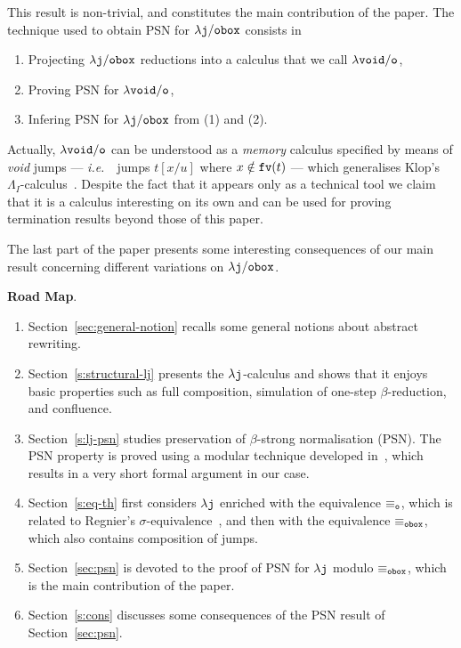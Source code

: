 \documentclass{LMCS}
\newcommand{\ie}{{\it  i.e.}~}
\renewcommand{\>}{\rightarrow}
\def\lam{\lambda}
\newcommand{\dis}{{\tt j}}
\newcommand{\ldis}{\lam{\dis}}
\newcommand{\fv}[1]{{\tt fv}(#1)}
\newcommand{\deft}[1]{{\bf #1}}
\newcommand{\modulo}[2]{#1/#2}
\newcommand{\eqw}[1]{\equiv_{#1}}
\newcommand{\eqo}{\equiv_\osym}
\newcommand{\osym}{{\tt o}}
\newcommand{\ldisf}{\lam \modulo{\dis}{\fsymb}}
\newcommand{\fsymb}{\osymb\boite}
\newcommand{\osymb}{{\tt o}}
\newcommand{\eqf}{\eqw{\fsymb}}
\newcommand{\aux}{{\tt void}}
\newcommand{\lauxm}{\lam\modulo{ \aux }{ \osymb }}
\newcommand{\boite}{{\tt box}}
\begin{document}
This result is non-trivial, and constitutes the main contribution of the paper.
The technique used to obtain PSN for $\ldisf$ consists in
\begin{enumerate}
\item Projecting $\ldisf$ reductions into a calculus that we call $\lauxm$,
\item Proving PSN for $\lauxm$,
\item Infering PSN for $\ldisf$ from (1) and (2).
\end{enumerate}
Actually, $\lauxm$ can be understood as a \textit{memory}
calculus specified by means of \textit{void} jumps --- \ie\ jumps $t[x/u]$ where $x\notin\fv{t}$ --- 
which generalises Klop's $\Lambda_I$-calculus~\cite{Klo}. 
Despite 
the fact that it  appears only
as a technical tool we claim that 
it is a calculus interesting
on its own and can be used for proving termination
results beyond those of this paper.

The last part of the paper presents some interesting consequences of
our main result concerning different variations on
$\ldisf$.  \medskip

\deft{Road Map}.

\begin{enumerate}[$\bullet$]
\item Section~\ref{sec:general-notion} recalls some general 
notions about abstract rewriting.

\item Section~\ref{s:structural-lj} presents the $\ldis$-calculus and 
  shows  that  it   enjoys  basic properties such as full composition,
  simulation   of   one-step
  $\beta$-reduction, and confluence.

\item Section~\ref{s:lj-psn} studies    preservation of 
$\beta$-strong normalisation (PSN). The     PSN    property is proved   using     a   modular  
  technique developed in~\cite{Kes09}, which  results in a
  very short  formal argument in our  case. 
 
\item Section~\ref{s:eq-th} first considers $\ldis$ 
  enriched with the 
  equivalence $\eqo$, which is related to Regnier's
  $\sigma$-equivalence~\cite{regnier94},  and 
then with the equivalence $\eqf$, which also contains composition of
  jumps.

\item Section~\ref{sec:psn} is devoted to the proof of PSN for $\ldis$ modulo $\eqf$,
which  is the main  contribution of the  paper.

\item Section~\ref{s:cons} discusses some consequences of the PSN result of
  Section~\ref{sec:psn}.
\end{enumerate}
\end{document}
